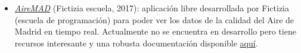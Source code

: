 \begin{itemize}
	\item \href{https://github.com/Fictizia/aireMAD}{\textit{AireMAD}} (Fictizia escuela, 2017): aplicación libre desarrollada por Fictizia (escuela de programación) para poder ver los datos de la calidad del Aire de Madrid en tiempo real. Actualmente no se encuentra en desarrollo pero tiene recursos interesante y una robusta documentación disponible  \href{https://github.com/Fictizia/aireMAD/wiki}{aquí}.
\end{itemize}


 
